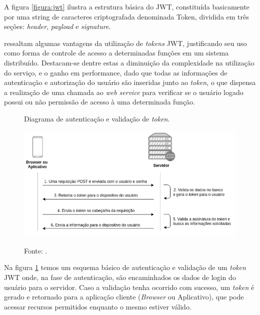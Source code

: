 A figura \ref{figura:jwt} ilustra a estrutura básica do JWT, constituída basicamente por uma string de caracteres criptografada denominada Token, dividida em três seções: \textit{header}, \textit{payload} e \textit{signature}.

 ressaltam algumas vantagens da utilização de \textit{tokens} JWT, justificando seu uso como forma de controle de acesso a determinadas funções em um sistema distribuído. Destacam-se dentre estas a diminuição da complexidade na utilização do serviço, e o ganho em performance, dado que todas as informações de autenticação e autorização do usuário são inseridas junto ao \textit{token}, o que dispensa a realização de uma chamada ao \textit{web service} para verificar se o usuário logado possui ou não permissão de acesso à uma determinada função.

\newpage

\begin{figure}[h]
	\caption{Diagrama de autenticação e validação de \textit{token}.}
	\centering %
	\includegraphics[width=14cm]{resources/jwt-schema.png} %
	\label{figura:jwt-schema}	
	\caption*{Fonte: .}
\end{figure}

Na figura \ref{figura:jwt-schema} temos um esquema básico de autenticação e validação de um \textit{token} JWT onde, na fase de autenticação, são encaminhados os dados de login do usuário para o servidor. Caso a validação tenha ocorrido com sucesso, um \textit{token} é gerado e retornado para a aplicação cliente (\textit{Browser} ou Aplicativo), que pode acessar recursos permitidos enquanto o mesmo estiver válido.

